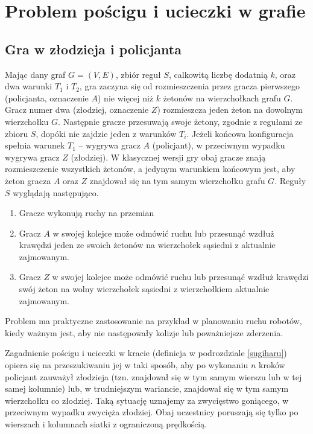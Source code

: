 \documentclass[brudnopis]{xmgr}
\theoremstyle{definition}
\begin{document}
\chapter{Problem pościgu i ucieczki w grafie}
\section{Gra w złodzieja i policjanta}\label{sec:poscig}
Mając dany graf $G=(V,E)$, zbiór reguł $S$, calkowitą liczbę dodatnią $k$, oraz dwa warunki $T_1$ i $T_2$, gra zaczyna się od rozmieszczenia przez gracza pierwszego (policjanta, oznaczenie $A$) nie więcej niż $k$ żetonów na wierzchołkach grafu $G$. Gracz numer dwa (złodziej, oznaczenie $Z$) rozmieszcza jeden żeton na dowolnym wierzchołku $G$. Następnie gracze przesuwają swoje żetony, zgodnie z regułami ze zbioru $S$, dopóki nie zajdzie jeden z warunków $T_i$. Jeżeli końcowa konfiguracja spełnia warunek $T_1$ -- wygrywa gracz $A$ (policjant), w przeciwnym wypadku wygrywa gracz $Z$ (złodziej). W klasycznej wersji gry  obaj gracze znają rozmieszczenie wszystkich żetonów, a jedynym warunkiem końcowym jest, aby żeton gracza $A$ oraz $Z$ znajdował się na tym samym wierzchołku grafu $G$.
Reguły $S$ wyglądają następująco.
\begin{enumerate}
  \item Gracze wykonują ruchy na przemian
  \item Gracz $A$ w swojej kolejce może odmówić ruchu lub przesunąć wzdłuż krawędzi jeden ze swoich żetonów na wierzchołek sąsiedni z aktualnie zajmowanym.
  \item Gracz $Z$ w swojej kolejce może odmówić ruchu lub przesunąć wzdłuż krawędzi swój żeton na wolny wierzchołek sąsiedni z wierzchołkiem aktualnie zajmowanym.
\end{enumerate}

Problem ma praktyczne zastosowanie na przykład w planowaniu ruchu robotów, kiedy ważnym jest, aby nie następowały kolizje lub poważniejsze zderzenia.

Zagadnienie pościgu i ucieczki w kracie (definicja w podrozdziale \ref{sugiharu}) opiera się na przeszukiwaniu jej w taki sposób, aby po wykonaniu $n$ kroków policjant zauważył złodzieja (tzn. znajdował się w tym samym wierszu lub w tej samej kolumnie) lub, w trudniejszym wariancie, znajdował się w tym samym wierzchołku co złodziej. Taką sytuację uznajemy za zwycięstwo goniącego, w przeciwnym wypadku zwycięża złodziej. Obaj uczestnicy poruszają się tylko po wierszach i kolumnach siatki z ograniczoną prędkością.
\end{document}
